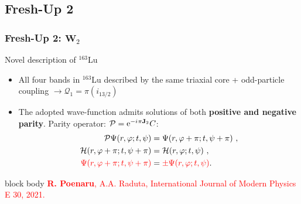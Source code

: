 \documentclass{beamer}
\newcommand{\iu}{{i\mkern1mu}}
\begin{document}
\subsection{Fresh-Up 2}

\begin{frame}
	\frametitle{Fresh-Up 2: $\mathbf{W}_2$}
	\begin{block}{Novel description of $^{163}$Lu}
		\begin{itemize}
			\item All four bands in $^{163}$Lu described by the same triaxial core + odd-particle coupling $\longrightarrow \mathcal{Q}_1=\pi(i_{13/2})$
			\item The adopted wave-function admits solutions of both \textbf{positive and negative parity}. Parity operator: $\mathcal{P}=\mathrm{e}^{-\iu\pi\mathbf{J}_2}C$:
			\begin{align}
				\mathcal{P}\Psi(r,\varphi;t,\psi)&=\Psi(r,\varphi+\pi;t,\psi+\pi)\nonumber\ ,\\
				\mathcal{H}(r,\varphi+\pi;t,\psi+\pi)&=\mathcal{H}(r,\varphi;t,\psi)\nonumber\ ,\\
				{\color{red}\Psi(r,\varphi+\pi;t,\psi+\pi)}&={\color{red}\pm\Psi(r,\varphi;t,\psi)}.\nonumber
			\end{align}
		\end{itemize}
	\end{block}
	\begin{beamercolorbox}[rounded=true,shadow=false, wd=\linewidth,]{block body}
		\centering
		\textcolor{red}{\footnotesize{\textbf{R. Poenaru}, A.A. Raduta, International Journal of Modern Physics E 30, 2021.}}
	\end{beamercolorbox}
\end{frame}
\end{document}

